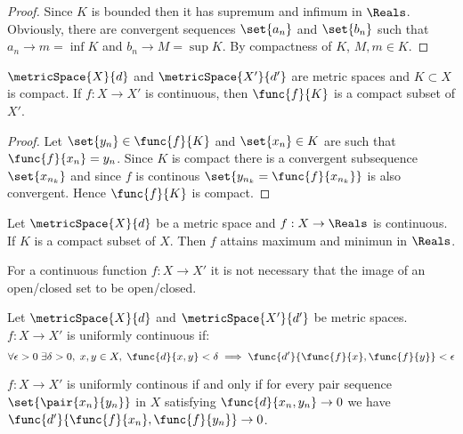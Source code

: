 \begin{proof}
    Since \(K\) is bounded then it has supremum and infimum in \(\Reals\). Obviously, there are convergent sequences \(\set{a_n}\) and \(\set{b_n}\) such that \(a_n \to m = \inf K\) and \(b_n \to M = \sup K\). By compactness of \(K\), \(M,m \in K\).
\end{proof}

\begin{theorem}
    \(\metricSpace{X}{d}\) and \(\metricSpace{X'}{d'}\) are metric spaces and \(K \subset X\) is compact. If \(f : X \to X'\) is continuous, then \(\func{f}{K}\) is a compact subset of \(X'\).
\end{theorem}

\begin{proof}
    Let \(\set{y_n} \in \func{f}{K}\) and \(\set{x_n} \in K\) are such that \(\func{f}{x_n} = y_n\). Since \(K\) is compact there is a convergent subsequence \(\set{x_{n_k}}\) and since \(f\) is continous \( \set{ y_{n_k} = \func{f}{x_{n_k}}}\) is also convergent. Hence \(\func{f}{K}\) is compact.
\end{proof}

\begin{corollary}
    Let \(\metricSpace{X}{d}\) be a metric space and \(f : X \to \Reals\) is continuous. If \(K\) is a compact subset of \(X\). Then \(f\) attains maximum and minimun in \(\Reals\).
\end{corollary}

\begin{note}
    For a continuous function \(f : X \to X'\) it is not necessary that the image of an open/closed set to be open/closed.
\end{note}

\begin{definition} 
    Let \(\metricSpace{X}{d}\) and \(\metricSpace{X'}{d'}\) be metric spaces.  \(f :X \to X'\) is uniformly continuous if:
    \begin{equation*}
        \forall \epsilon > 0\; \exists \delta > 0, \; x,y \in X, \; \func{d}{x,y} < \delta \implies \func{d'}{\func{f}{x},\func{f}{y}} < \epsilon
    \end{equation*}
\end{definition}

\begin{proposition}
    \(f: X \to X'\) is uniformly continous if and only if for every pair sequence \(\set{\pair{x_n}{y_n}}\) in \(X\) satisfying \(\func{d}{x_n,y_n} \to 0\) we have \(\func{d'}{\func{f}{x_n}, \func{f}{y_n}} \to 0\).
\end{proposition}

